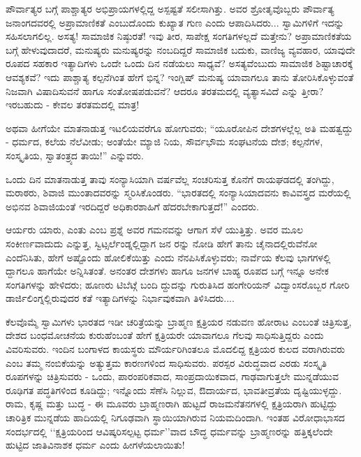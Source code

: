 ಪೌರ್ವಾತ್ಯರ ಬಗ್ಗೆ ಪಾಶ್ಚಾತ್ಯರ ಅಭಿಪ್ರಾಯಗಳಲ್ಲಿದ್ದ ಅಸ್ಪಷ್ಟತೆ ಸಲೀಸಾಗಿತ್ತು. ಅವರ ಶ್ರೋತೃವೊಬ್ಬರು ಪೌರ್ವಾತ್ಯ ಜನಾಂಗದವರಲ್ಲಿ ಅಪ್ರಾಮಾಣಿಕತೆ ಎಂಬುದೊಂದು ಕುಖ್ಯಾತ ಗುಣ ಎಂದು ಆಪಾದಿಸಿದರು... ಸ್ವಾಮಿಗಳಿಗೆ ಇದನ್ನು ಸಹಿಸಲಾಗಲಿಲ್ಲ. ಅಸತ್ಯ! ಸಾಮಾಜಿಕ ನಿಷ್ಠುರತೆ! ಇವು ತೀರ, ಸಾಪೇಕ್ಷ ಸಂಗತಿಗಳಲ್ಲದೆ ಮತ್ತೇನು? ಅಪ್ರಾಮಾಣಿಕತೆಯ ಬಗ್ಗೆ ಹೇಳುವುದಾದರೆ, ಮನುಷ್ಯರು ಮನುಷ್ಯರನ್ನು ನಂಬದಿದ್ದರೆ ಸಾಮಾಜಿಕ ಬದುಕು, ವಾಣಿಜ್ಯ ವ್ಯವಹಾರ, ಯಾವುದೇ ರೂಪದ ಸಹಕಾರ ಇತ್ಯಾದಿಗಳು ಒಂದೇ ಒಂದು ದಿನ ನಡೆಯಲು ಸಾಧ್ಯವೆ? ಅಸತ್ಯವೆಂಬುದು ಸಾಮಾಜಿಕ ಶಿಷ್ಟಾಚಾರಕ್ಕೆ ಆವಶ್ಯಕವೆ? ಇದು ಪಾಶ್ಚಾತ್ಯ ಕಲ್ಪನೆಗಿಂತ ಹೇಗೆ ಭಿನ್ನ? ಇಂಗ್ಲಿಷ್ ಮನುಷ್ಯ ಯಾವಾಗಲೂ ತಾನು ತೋರಿಸಿಕೊಳ್ಳುವಂತೆ ನಿಜವಾಗಿ ವಿಷಾದಿಸುವನೆ ಹಾಗೂ ಸಂತೋಷಪಡುವನೆ? ಆದರೂ ತರತಮದಲ್ಲಿ ವ್ಯತ್ಯಾಸವಿದೆ ಎನ್ನು ತ್ತೀರಾ? ಇರಬಹುದು - ಕೇವಲ ತರತಮದಲ್ಲಿ ಮಾತ್ರ!

ಅಥವಾ ಹೀಗೆಯೇ ಮಾತನಾಡುತ್ತ ಇಟಲಿಯವರೆಗೂ ಹೋಗುವರು; “ಯೂರೋಪಿನ ದೇಶಗಳಲ್ಲೆಲ್ಲ ಅತಿ ಮಹತ್ವದ್ದು - ಧರ್ಮದ, ಕಲೆಯ ನೆಲೆವೀಡು; ಅಂತೆಯೇ ಮ್ಯಾಜಿ ನಿಯ, ಸೌರ್ವಭೌಮ ಸಂಘಟನೆಯ ದೇಶ; ಕಲ್ಪನೆಗಳ, ಸಂಸ್ಕೃತಿಯ, ಸ್ವಾತಂತ್ರ್ಯದ ತಾಯಿ!” ಎನ್ನುವರು.

ಒಂದು ದಿನ ಮಾತನಾಡುತ್ತ ತಾವು ಸಂನ್ಯಾಸಿಯಾಗಿ ವರ್ಷವೆಲ್ಲ ಸಂಚರಿಸುತ್ತ ಕೊನೆಗೆ ರಾಯಘಡದಲ್ಲಿ ತಂಗಿದ್ದು, ಮರಾಠರು, ಶಿವಾಜಿ ಮುಂತಾದವರನ್ನು ಸ್ಮರಿಸಿಕೊಂಡರು. “ಭಾರತದಲ್ಲಿ ಸಂನ್ಯಾಸಿಯಾದವನು ಕಾವಿವಸ್ತ್ರದ ಮರೆಯಲ್ಲಿ ಅಭಿನವ ಶಿವಾಜಿಯಂತೆ ಇರದಿದ್ದರೆ ಅಧಿಕಾರಶಾಹಿಗೆ ಹೆದರಬೇಕಾಗುತ್ತದೆ!” ಎಂದರು.

ಆರ್ಯರು ಯಾರು, ಎಂತು ಎಂಬ ಪ್ರಶ್ನೆ ಅವರ ಗಮನವನ್ನು ಆಗಾಗ ಸೆಳೆ ಯುತ್ತಿತ್ತು. ಅವರ ಮೂಲ ಸಂಕೀರ್ಣವಾದುದು ಎನ್ನುತ್ತ, ಸ್ವಿಟ್ಸರ್ಲೆಂಡ್ನಲ್ಲಿದ್ದಾಗ ಜನ ರನ್ನು ನೋಡಿ ಹೇಗೆ ತಾನು ಚೈನಾದಲ್ಲಿರುವೆನೋ ಎಂದೆನಿಸಿತು, ಹೇಗೆ ಅಷ್ಟೊಂದು ಹೋಲಿಕೆಯಿತ್ತು ಎಂದು ನೆನಪಿಸಿಕೊಳ್ಳುವರು; ನಾರ್ವೆಯ ಕೆಲವು ಭಾಗಗಳಲ್ಲಿ ದ್ದಾಗಲೂ ಹಾಗೆಯೇ ಅನ್ನಿಸಿತಂತೆ. ಅನಂತರ ದೇಶಗಳು ಹಾಗೂ ಜನಗಳ ಬಾಹ್ಯ ರೂಪದ ಬಗ್ಗೆ ಇನ್ನೂ ಅನೇಕ ಸಂಗತಿಗಳನ್ನು ಹೇಳಿದರು; ಹೂಣರು ಟಿಬೆಟ್ಗೆ ಬಂದಿ ದ್ದುದನ್ನು ಗುರುತಿಸಿದ ಹಂಗೇರಿಯನ್ ವಿದ್ವಾಂಸರೊಬ್ಬರ ಗೋರಿ ಡಾರ್ಜಿಲಿಂಗ್ನಲ್ಲಿರುವುದರ ಕತೆ ಇತ್ಯಾದಿಗಳನ್ನು ನಿರ್ಭಾವುಕವಾಗಿ ತಿಳಿಸಿದರು....

 ಕೆಲವೊಮ್ಮೆ ಸ್ವಾಮಿಗಳು ಭಾರತದ ಇಡೀ ಚರಿತ್ರೆಯನ್ನು ಬ್ರಾಹ್ಮಣ ಕ್ಷತ್ರಿಯರ ನಡುವಣ ಹೋರಾಟ ಎಂಬಂತೆ ಚಿತ್ರಿಸುತ್ತ, ದೇಶದ ಬಂಧಮೋಚನೆಯ ಕುರುಹೆಂಬಂತೆ ಹೇಗೆ ಕ್ಷತ್ರಿಯರೇ ಯಾವಾಗಲೂ ಗೆಲವು ಸಾಧಿಸುತ್ತಿದ್ದರು ಎಂದು ವಿವರಿಸುವರು. ಇಂದಿನ ಬಂಗಾಳದ ಕಾಯಸ್ಥರು ಮೌರ್ಯರಿಗಿಂತಲೂ ಮೊದಲಿದ್ದ ಕ್ಷತ್ರಿಯರ ಕುಲದ ವರಾಗಿರುವರು ಎಂಬ ತಮ್ಮ ನಂಬಿಕೆಯನ್ನು ಅತ್ಯುತ್ತಮ ಕಾರಣಗಳಿಂದ ಸಾಧಿಸುವರು. ಪರಸ್ಪರ ವಿರುದ್ಧವಾದ ಎರಡು ಸಂಸ್ಕೃತಿ ರೂಪಗಳನ್ನು ಚಿತ್ರಿಸುವರು - ಒಂದು, ಪಾರಂಪರಿಕವಾದ, ಸಾಂಪ್ರದಾಯಿಕವಾದ, ಗಾಢವಾಗುತ್ತಲೇ ಮುನ್ನಡೆಯುವ ರೂಢಿಗತ ಪದ್ಧತಿಗಳಿಂದ ಕೂಡಿದ್ದು; ಇನ್ನೊಂದು ಸೆಣೆಸಿ ನಿಲ್ಲುವ, ಔದಾರ್ಯದ, ಭಾವತೀವ್ರತೆಯ ದೃಷ್ಟಿಯುಳ್ಳದ್ದು. ರಾಮ, ಕೃಷ್ಣ ಮತ್ತು ಬುದ್ಧ - ಈ ಮೂವರು ಬ್ರಾಹ್ಮಣರಾಗಿ ಹುಟ್ಟದೆ ರಾಜಮನೆತನಗಳಲ್ಲಿ ಕ್ಷತ್ರಿಯರಾಗಿ ಹುಟ್ಟಿದ್ದು ಚಾರಿತ್ರಿಕ ಮುನ್ನಡೆಯ ಹಾದಿಯಲ್ಲಿ ನಿಗೂಢವಾಗಿ ಸ್ಥಾಯಿಯಾಗಿರುವ ನಿಯಮದಿಂದಾಗಿ. ಇಂತಹ ವಿರೋಧಾಭಾಸದ ಸಂದರ್ಭದಲ್ಲಿ ‘‘ಕ್ಷತ್ರಿಯರಿಂದ ಆವಿಷ್ಕರಿಸಲ್ಪಟ್ಟ ಧರ್ಮ’’ವಾದ ಬೌದ್ಧ ಧರ್ಮವನ್ನು ಬ್ರಾಹ್ಮಣರನ್ನು ಹತ್ತಿಕ್ಕಲೆಂದೇ ಹುಟ್ಟಿದ ಜಾತಿವಿನಾಶಕ ಧರ್ಮ ಎಂದು ಹೀಗಳೆಯಲಾಯಿತು!

